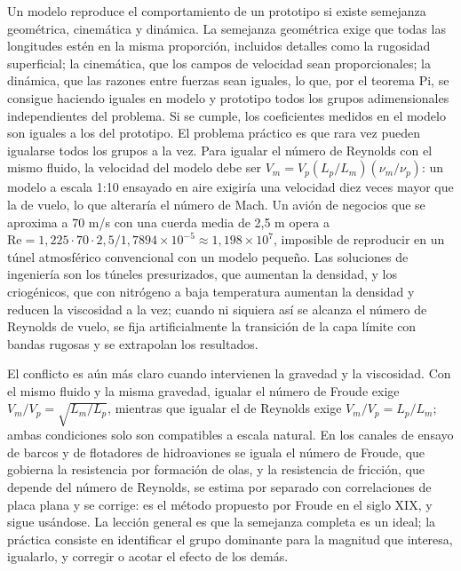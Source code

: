 \documentclass[10pt,openany]{book}
\begin{document}
Un modelo reproduce el comportamiento de un prototipo si existe semejanza geométrica, cinemática y dinámica. La semejanza geométrica exige que todas las longitudes estén en la misma proporción, incluidos detalles como la rugosidad superficial; la cinemática, que los campos de velocidad sean proporcionales; la dinámica, que las razones entre fuerzas sean iguales, lo que, por el teorema Pi, se consigue haciendo iguales en modelo y prototipo todos los grupos adimensionales independientes del problema. Si se cumple, los coeficientes medidos en el modelo son iguales a los del prototipo. El problema práctico es que rara vez pueden igualarse todos los grupos a la vez. Para igualar el número de Reynolds con el mismo fluido, la velocidad del modelo debe ser \(V_m = V_p(L_p/L_m)(\nu_m/\nu_p)\): un modelo a escala 1:10 ensayado en aire exigiría una velocidad diez veces mayor que la de vuelo, lo que alteraría el número de Mach. Un avión de negocios que se aproxima a 70 m/s con una cuerda media de 2,5 m opera a \(\mathrm{Re} = 1{,}225\cdot 70\cdot 2{,}5/1{,}7894\times 10^{-5} \approx 1{,}198\times 10^{7}\), imposible de reproducir en un túnel atmosférico convencional con un modelo pequeño. Las soluciones de ingeniería son los túneles presurizados, que aumentan la densidad, y los criogénicos, que con nitrógeno a baja temperatura aumentan la densidad y reducen la viscosidad a la vez; cuando ni siquiera así se alcanza el número de Reynolds de vuelo, se fija artificialmente la transición de la capa límite con bandas rugosas y se extrapolan los resultados.

El conflicto es aún más claro cuando intervienen la gravedad y la viscosidad. Con el mismo fluido y la misma gravedad, igualar el número de Froude exige \(V_m/V_p = \sqrt{L_m/L_p}\), mientras que igualar el de Reynolds exige \(V_m/V_p = L_p/L_m\); ambas condiciones solo son compatibles a escala natural. En los canales de ensayo de barcos y de flotadores de hidroaviones se iguala el número de Froude, que gobierna la resistencia por formación de olas, y la resistencia de fricción, que depende del número de Reynolds, se estima por separado con correlaciones de placa plana y se corrige: es el método propuesto por Froude en el siglo XIX, y sigue usándose. La lección general es que la semejanza completa es un ideal; la práctica consiste en identificar el grupo dominante para la magnitud que interesa, igualarlo, y corregir o acotar el efecto de los demás.
\end{document}
